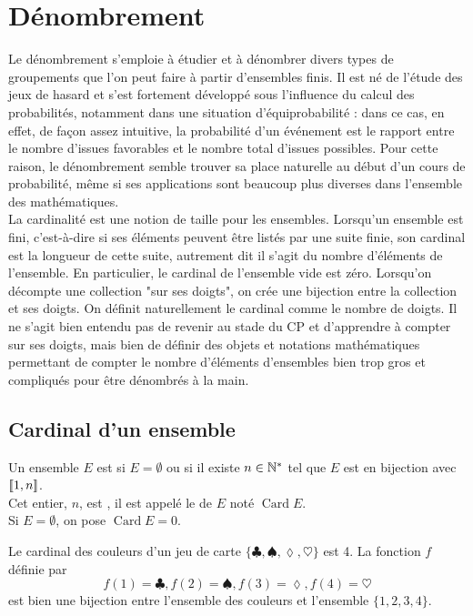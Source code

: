 \documentclass{book}
\begin{document}
\chapter*{Dénombrement}
Le dénombrement s'emploie à étudier et à dénombrer divers types de groupements que l'on peut faire à partir d'ensembles finis.
Il est né de l'étude des jeux de hasard et s'est fortement développé sous l'influence du calcul des probabilités, notamment dans une
situation d'équiprobabilité : dans ce cas, en effet, de façon assez intuitive, la probabilité d'un événement
est le rapport entre le nombre d'issues favorables et le nombre total d'issues possibles. Pour cette raison, le dénombrement semble trouver sa place naturelle au début d'un cours de probabilité, même si ses applications sont beaucoup plus diverses dans l'ensemble des mathématiques.\\
La cardinalité est une notion de taille pour les ensembles. Lorsqu'un ensemble est fini, c'est-à-dire si ses éléments peuvent être listés par une suite finie, son cardinal est la longueur de cette suite, autrement dit il s'agit du nombre d'éléments de l'ensemble. En particulier, le cardinal de l'ensemble vide est zéro. Lorsqu'on décompte une collection "sur ses doigts", on crée une bijection entre la collection et ses doigts. On définit naturellement le cardinal comme le nombre de doigts. Il ne s'agit bien entendu pas de revenir au stade du CP et d'apprendre à compter sur ses doigts, mais
bien de définir des objets et notations mathématiques permettant de compter le nombre d'éléments
d'ensembles bien trop gros et compliqués pour être dénombrés à la main.
\section{Cardinal d'un ensemble}
\begin{DefinitionProposition}[Cardinal]
Un ensemble $E$ est  si $E=\emptyset$ ou si il existe $ n\in\mathbb{N}^{\ast}$ tel que $E$ est en bijection avec $\mathopen\lbrack\!\lbrack1,n \mathclose\rbrack\!\rbrack$.\\
Cet entier, $n$, est , il est appelé le  de $E$ noté $\operatorname{Card}{E}$.\\
Si $E=\emptyset$, on pose $\operatorname{Card} E=0$.
\end{DefinitionProposition}
\begin{Exemple}
Le cardinal des couleurs d'un jeu de carte $\{\clubsuit , \spadesuit, \lozenge,\heartsuit\}$ est 4.  La fonction $f$ définie par \[f(1)=\clubsuit, f(2)=\spadesuit, f(3)=\lozenge, f(4)=\heartsuit\] est bien une bijection entre l'ensemble des couleurs et l'ensemble $\{1,2,3,4\}$.
\end{Exemple}
\end{document}
